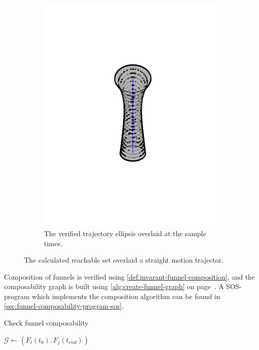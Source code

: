 \begin{figure}[!t]
\begin{subfigure}[b]{0.5\textwidth}
    \includegraphics[trim={5cm 5cm 5cm 5cm},
    width=.95\textwidth]{figures/method/funnel-sampled}
    \caption{The verified trajectory ellipsis overlaid at the sample times.}
  \end{subfigure}
  \caption[A funnel overlaid a trajector]{The calculated reachable set overlaid
    a straight motion trajector.}
    \label{fig:funnel-straight-sampled}
\end{figure}

Composition of funnels is verified using \cref{def:invarant-funnel-composition},
and the composability graph is built using \cref{alg:create-funnel-graph} on
page~\pageref{alg:create-funnel-graph}. A \ac{SOS}-program which implements the
composition algorithm can be found in
\cref{sec:funnel-composability-program-sos}.

\begin{algorithm}[H]
  \caption{Check funnel composability}
  \label{alg:create-funnel-graph}
  \begin{algorithmic}[0]
     
      \State \(\mathcal{G} \leftarrow{} \left( F_{i}(t_{0}), F_{j}(t_{end})
      \right)\)
    \EndIf
    \EndFor
    \EndFor
    \EndProcedure
  \end{algorithmic}
\end{algorithm}


